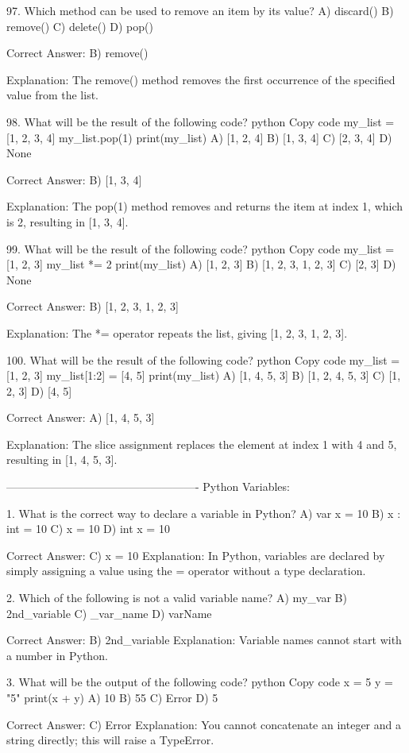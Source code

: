 97. Which method can be used to remove an item by its value?
A) discard()
B) remove()
C) delete()
D) pop()

Correct Answer: B) remove()

Explanation:
The remove() method removes the first occurrence of the specified value from the list.

98. What will be the result of the following code?
python
Copy code
my_list = [1, 2, 3, 4]
my_list.pop(1)
print(my_list)
A) [1, 2, 4]
B) [1, 3, 4]
C) [2, 3, 4]
D) None

Correct Answer: B) [1, 3, 4]

Explanation:
The pop(1) method removes and returns the item at index 1, which is 2, resulting in [1, 3, 4].

99. What will be the result of the following code?
python
Copy code
my_list = [1, 2, 3]
my_list *= 2
print(my_list)
A) [1, 2, 3]
B) [1, 2, 3, 1, 2, 3]
C) [2, 3]
D) None

Correct Answer: B) [1, 2, 3, 1, 2, 3]

Explanation:
The *= operator repeats the list, giving [1, 2, 3, 1, 2, 3].

100. What will be the result of the following code?
python
Copy code
my_list = [1, 2, 3]
my_list[1:2] = [4, 5]
print(my_list)
A) [1, 4, 5, 3]
B) [1, 2, 4, 5, 3]
C) [1, 2, 3]
D) [4, 5]

Correct Answer: A) [1, 4, 5, 3]

Explanation:
The slice assignment replaces the element at index 1 with 4 and 5, resulting in [1, 4, 5, 3].

----------------------------------------------------
Python Variables:

1. What is the correct way to declare a variable in Python?
A) var x = 10
B) x : int = 10
C) x = 10
D) int x = 10

Correct Answer: C) x = 10
Explanation: In Python, variables are declared by simply assigning a value using the = operator without a type declaration.

2. Which of the following is not a valid variable name?
A) my_var
B) 2nd_variable
C) _var_name
D) varName

Correct Answer: B) 2nd_variable
Explanation: Variable names cannot start with a number in Python.

3. What will be the output of the following code?
python
Copy code
x = 5
y = "5"
print(x + y)
A) 10
B) 55
C) Error
D) 5

Correct Answer: C) Error
Explanation: You cannot concatenate an integer and a string directly; this will raise a TypeError.

